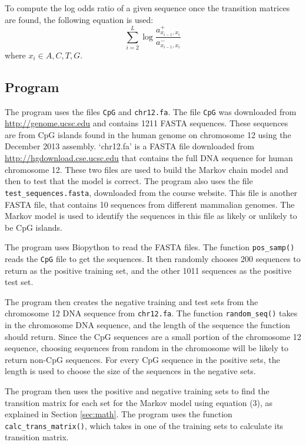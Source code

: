 \documentclass{acm_proc_article-sp}
\begin{document}
To compute the log odds ratio of a given sequence once the transition matrices are found, the following equation is used:
\begin{equation} \sum\limits_{i=2}^L \log{\frac{a^+_{x_{i-1},x_{i}}}{a^-_{x_{i-1},x_{i}}}} \end{equation}
where $x_{i} \in {A,C,T,G}$.

\subsection{Program}
The program uses the files \texttt{CpG} and \texttt{chr12.fa}.  The file \texttt{CpG} was downloaded from \hyperref[http://genome.ucsc.edu/cgi-bin/hgTables?hgsid=444312915_EcUDmaoda0cHkB6XzADvJ9eK7PZM]{http://genome.ucsc.edu} and contains 1211 FASTA sequences.  These sequences are from CpG islands found in the human genome on chromosome 12 using the December 2013 assembly.  `chr12.fa' is a FASTA file downloaded from \hyperref[http://hgdownload.cse.ucsc.edu/goldenPath/hg38/chromosomes/]{http://hgdownload.cse.ucsc.edu} that contains the full DNA sequence for human chromosome 12. These two files are used to build the Markov chain model and then to test that the model is correct.  The program also uses the file \texttt{test\_sequences.fasta}, downloaded from the course website.  This file is another FASTA file, that contains 10 sequences from different mammalian genomes.  The Markov model is used to identify the sequences in this file as likely or unlikely to be CpG islands.

The program uses Biopython to read the FASTA files.  The function \texttt{pos\_samp()} reads the \texttt{CpG} file to get the sequences. It then randomly chooses 200 sequences to return as the positive training set, and the other 1011 sequences as the positive test set.

The program then creates the negative training and test sets from the chromosome 12 DNA sequence from \texttt{chr12.fa}.  The function \texttt{random\_seq()} takes in the chromosome DNA sequence, and the length of the sequence the function should return. Since the CpG sequences are a small portion of the chromosome 12 sequence, choosing sequences from random in the chromosome will be likely to return non-CpG sequences.  For every CpG sequence in the positive sets, the length is used to choose the size of the sequences in the negative sets. 

The program then uses the positive and negative training sets to find the transition matrix for each set for the Markov model using equation (3), as explained in Section \ref{sec:math}.  The program uses the function \texttt{calc\_trans\_matrix()}, which takes in one of the training sets to calculate its transition matrix.  
\end{document}
